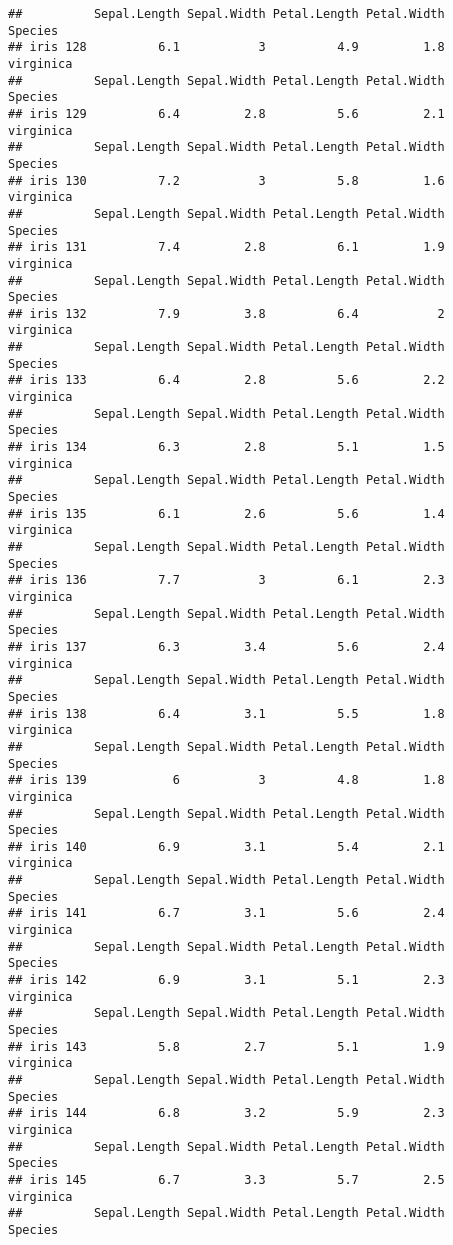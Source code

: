 \documentclass[
]{article}
\begin{document}
\begin{verbatim}
##          Sepal.Length Sepal.Width Petal.Length Petal.Width   Species
## iris 128          6.1           3          4.9         1.8 virginica
##          Sepal.Length Sepal.Width Petal.Length Petal.Width   Species
## iris 129          6.4         2.8          5.6         2.1 virginica
##          Sepal.Length Sepal.Width Petal.Length Petal.Width   Species
## iris 130          7.2           3          5.8         1.6 virginica
##          Sepal.Length Sepal.Width Petal.Length Petal.Width   Species
## iris 131          7.4         2.8          6.1         1.9 virginica
##          Sepal.Length Sepal.Width Petal.Length Petal.Width   Species
## iris 132          7.9         3.8          6.4           2 virginica
##          Sepal.Length Sepal.Width Petal.Length Petal.Width   Species
## iris 133          6.4         2.8          5.6         2.2 virginica
##          Sepal.Length Sepal.Width Petal.Length Petal.Width   Species
## iris 134          6.3         2.8          5.1         1.5 virginica
##          Sepal.Length Sepal.Width Petal.Length Petal.Width   Species
## iris 135          6.1         2.6          5.6         1.4 virginica
##          Sepal.Length Sepal.Width Petal.Length Petal.Width   Species
## iris 136          7.7           3          6.1         2.3 virginica
##          Sepal.Length Sepal.Width Petal.Length Petal.Width   Species
## iris 137          6.3         3.4          5.6         2.4 virginica
##          Sepal.Length Sepal.Width Petal.Length Petal.Width   Species
## iris 138          6.4         3.1          5.5         1.8 virginica
##          Sepal.Length Sepal.Width Petal.Length Petal.Width   Species
## iris 139            6           3          4.8         1.8 virginica
##          Sepal.Length Sepal.Width Petal.Length Petal.Width   Species
## iris 140          6.9         3.1          5.4         2.1 virginica
##          Sepal.Length Sepal.Width Petal.Length Petal.Width   Species
## iris 141          6.7         3.1          5.6         2.4 virginica
##          Sepal.Length Sepal.Width Petal.Length Petal.Width   Species
## iris 142          6.9         3.1          5.1         2.3 virginica
##          Sepal.Length Sepal.Width Petal.Length Petal.Width   Species
## iris 143          5.8         2.7          5.1         1.9 virginica
##          Sepal.Length Sepal.Width Petal.Length Petal.Width   Species
## iris 144          6.8         3.2          5.9         2.3 virginica
##          Sepal.Length Sepal.Width Petal.Length Petal.Width   Species
## iris 145          6.7         3.3          5.7         2.5 virginica
##          Sepal.Length Sepal.Width Petal.Length Petal.Width   Species

\end{verbatim}
\end{document}
